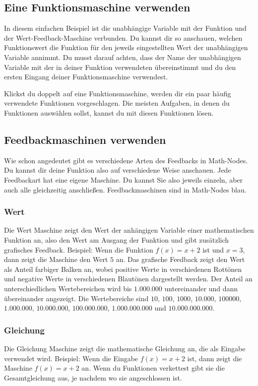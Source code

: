 \documentclass[12pt]{report}
\begin{document}
\subsection{Eine Funktionsmaschine verwenden}
In diesem einfachen Beispiel ist die unabhängige Variable mit der Funktion und der Wert-Feedback-Maschine verbunden. Du kannst dir so anschauen, welchen Funktionswert die Funktion für den jeweils eingestellten Wert der unabhängigen Variable annimmt. Du musst darauf achten, dass der Name der unabhängigen Variable mit der in deiner Funktion verwendeten übereinstimmt und du den ersten Eingang deiner Funktionsmaschine verwendest.\par
Klickst du doppelt auf eine Funktionsmaschine, werden dir ein paar häufig verwendete Funktionen vorgeschlagen. Die meisten Aufgaben, in denen du Funktionen auswählen sollst, kannst du mit diesen Funktionen lösen. 
\subsection{Feedbackmaschinen verwenden}
Wie schon angedeutet gibt es verschiedene Arten des Feedbacks in Math-Nodes. Du kannst dir deine Funktion also auf verschiedene Weise anschauen. Jede Feedbackart hat eine eigene Maschine. Du kannst Sie also jeweils einzeln, aber auch alle gleichzeitig anschließen. Feedbackmaschinen sind in Math-Nodes blau.
\subsubsection{Wert}
Die Wert Maschine zeigt den Wert der anhängigen Variable einer mathematischen Funktion an, also den Wert am Ausgang der Funktion und gibt zusätzlich grafisches Feedback. 
Beispiel: Wenn die Funktion $f(x) = x + 2$ ist und $x = 3$, dann zeigt die Maschine den Wert $5$ an. 
Das grafische Feedback zeigt den Wert als Anteil farbiger Balken an, wobei positive Werte in verschiedenen Rottönen und negative Werte in verschiedenen Blautönen dargestellt werden. Der Anteil an unterschiedlichen Wertebereichen wird bis $1.000.000$ untereinander und dann übereinander angezeigt. Die Wertebereiche sind $10$, $100$, $1000$, $10.000$, $100000$, $1.000.000$, $10.000.000$, $100.000.000$, $1.000.000.000$ und $10.000.000.000$.
\subsubsection{Gleichung}
Die Gleichung Maschine zeigt die mathematische Gleichung an, die als Eingabe verwendet wird. Beispiel: Wenn die Eingabe $f(x) = x + 2$ ist, dann zeigt die Maschine $f(x) = x + 2$ an. Wenn du Funktionen verkettest gibt sie die Gesamtgleichung aus, je nachdem wo sie angeschlossen ist.
\end{document}
